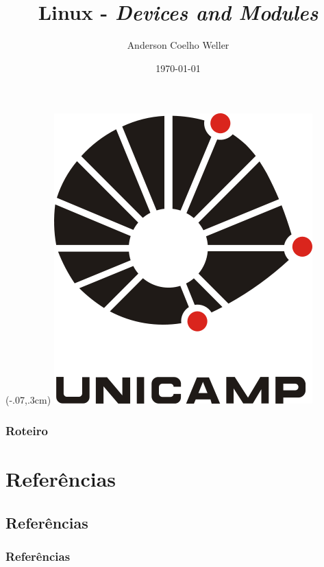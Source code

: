 \documentclass[hyphens]{beamer}
\title[\textit{Devices and Modules}]{Linux - \textit{Devices and Modules}}
\author[Anderson Weller]{Anderson Coelho Weller}
\institute[Unicamp]{Universidade Estadual de Campinas\\Instituto de Computação}
\date{\today}
\begin{document}
{
	\begin{frame}

		\titlepage

		\begin{textblock*}{100mm}(-.07\textwidth,.3cm)
			\includegraphics[scale=.056]{uec}
		\end{textblock*}
		
	\end{frame}
}


\begin{frame}
	\frametitle{Roteiro}
	\tableofcontents
\end{frame}








\section*{Referências}
\subsection*{Referências}
{
	\renewcommand{\pgfuseimage}[1]{\scalebox{.65}{\texttt{[image: \#1]}}}
	
	\begin{frame}[allowframebreaks]
		\frametitle{Referências}
		
		{
			\scriptsize
			
		}
	\end{frame}
}
\end{document}
